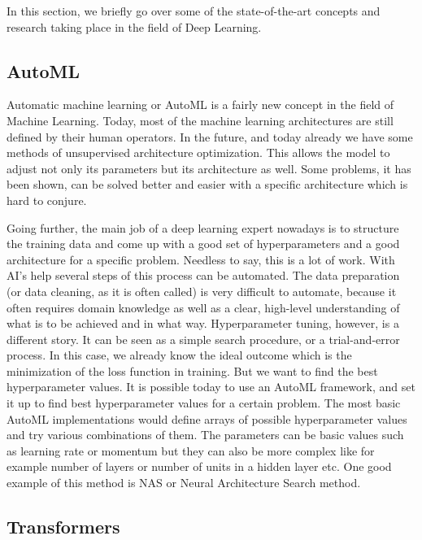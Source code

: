 \documentclass[b5paper]{book}
\begin{document}
In this section, we briefly go over some of the state-of-the-art concepts and research taking place in the field of Deep Learning.

\subsection{AutoML}

Automatic machine learning or AutoML is a fairly new concept in the field of Machine Learning. Today, most of the machine learning architectures are still defined by their human operators. In the future, and today already we have some methods of unsupervised architecture optimization. This allows the model to adjust not only its parameters but its architecture as well. Some problems, it has been shown, can be solved better and easier with a specific architecture which is hard to conjure. 

Going further, the main job of a deep learning expert nowadays is to structure the training data and come up with a good set of hyperparameters and a good architecture for a specific problem. Needless to say, this is a lot of work. With AI's help several steps of this process can be automated. The data preparation (or data cleaning, as it is often called) is very difficult to automate, because it often requires domain knowledge as well as a clear, high-level understanding of what is to be achieved and in what way. Hyperparameter tuning, however, is a different story. It can be seen as a simple search procedure, or a trial-and-error process. In this case, we already know the ideal outcome which is the minimization of the loss function in training. But we want to find the best hyperparameter values. It is possible today to use an AutoML framework, and set it up to find best hyperparameter values for a certain problem. The most basic AutoML implementations would define arrays of possible hyperparameter values and try various combinations of them. The parameters can be basic values such as learning rate or momentum but they can also be more complex like for example number of layers or number of units in a hidden layer etc. One good example of this method is NAS or Neural Architecture Search method.

\subsection{Transformers}
\end{document}
